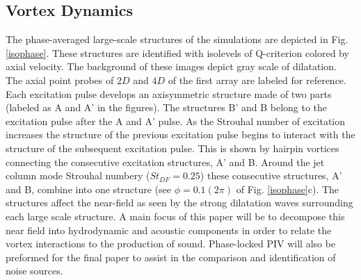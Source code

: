 \documentclass[english]{aiaa-tc}
\begin{document}
\subsection{Vortex Dynamics}
The phase-averaged large-scale structures of the simulations are depicted in Fig. \ref{isophase}. These structures are identified with isolevels of Q-criterion colored by axial velocity. The background of these images depict gray scale of dilatation. The axial point probes of $2D$ and $4D$ of the first array are labeled for reference. Each excitation pulse develops an axisymmetric structure made of two parts (labeled as A and A' in the figures). The structures B' and B belong to the excitation pulse after the A and A' pulse. As the Strouhal number of excitation increases the structure of the previous excitation pulse begins to interact with the structure of the subsequent excitation pulse. This is shown by hairpin vortices connecting the consecutive excitation structures, A' and B. Around the jet column mode Strouhal numbery ($St_{DF}=0.25$) these consecutive structures, A' and B, combine into one structure (see $\phi=0.1(2\pi)$ of Fig. \ref{isophase}c). The structures affect the near-field as seen by the strong dilatation waves surrounding each large scale structure. A main focus of this paper will be to decompose this near field into hydrodynamic and acoustic components in order to relate the vortex interactions to the production of sound. Phase-locked PIV will also be preformed for the final paper to assist in the comparison and identification of noise sources.
\end{document}
